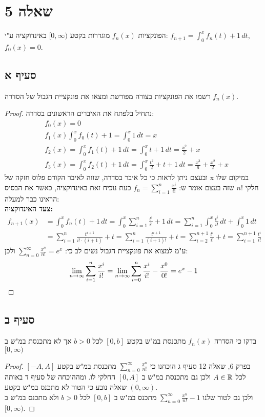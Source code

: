 \documentclass{article}
\begin{document}
	\pagebreak
	\section*{שאלה 5}
	הפונקציות $f_n(x)$ מוגדרות בקטע $[0, \infty)$ באינדוקציה ע"י:
	$f_{n+1} = \int_0^x f_n(t) + 1 \, dt$, $f_0(x) = 0$.
	\subsection*{סעיף א}
	רשמו את הפונקציות בצורה מפורשת ומצאו את פונקציית הגבול של הסדרה $f_n(x)$.
	\begin{proof}
		נתחיל בלפתח את האיברים הראשונים בסדרה:
		\begin{align*}
			&f_0(x) = 0 \\
			&f_1(x) \int_0^x f_0(t) + 1 = \int_0^x 1 \, dt = x \\
			&f_2(x) = \int_0^x f_1(t) + 1 \, dt = \int_0^x t + 1 \, dt = \frac{x^2}{2} + x \\
			&f_3(x) = \int_0^x f_2(t) + 1 \, dt = \int_0^x \frac{t^2}{2} + t + 1 \, dt = \frac{x^3}{6} + \frac{x^2}{2} + x
		\end{align*}
		ובעצם ניתן לראות כי כל איבר בסדרה, שווה לאיבר הקודם פלוס חזקה של x במיקום שלו חלקי $n!$
		שזה בעצם אומר ש: $f_n = \sum_{i=1}^n \frac{x^i}{i!}$
		כעת נוכיח זאת באינדוקציה, כאשר את הבסיס הראינו כבר למעלה: \\
		\textbf{צעד האינדוקציה:}
		\begin{align*}
			f_{n+1}(x)
			&= \int_0^x f_n(t) + 1 \, dt
			= \int_0^x \sum_{i=1}^n \frac{t^i}{i!} + 1 \, dt
			=  \sum_{i=1}^n \int_0^x \frac{t^i}{i!} \, dt + \int_0^x 1 \, dt \\
			&=  \sum_{i=1}^n \frac{t^{i + 1}}{i! \cdot (i+1)} + t
			=  \sum_{i=1}^n \frac{t^{i + 1}}{(i+1)!} + t
			=  \sum_{i=2}^{n + 1} \frac{t^i}{i!} + t
			=  \sum_{i=1}^{n + 1} \frac{t^i}{i!}
		\end{align*}
		ע"מ למצוא את פונקציית הגבול נשים לב כי: $\sum_{n=0}^\infty \frac{x^n}{n!} = e^x$
		ולכן:
		\begin{align*}
			\displaystyle{\lim_{n \to \infty}} \sum_{i=1}^n \frac{x^i}{i!}
			= \displaystyle{\lim_{n \to \infty}} \sum_{i=0}^n \frac{x^i}{i!} - \frac{x^0}{0!}
			= e^x - 1
		\end{align*}
	\end{proof}

	\subsection*{סעיף ב}
	בדקו כי הסדרה $f_n(x)$ מתכנסת במ"ש בקטע $[0, b]$ לכל $b > 0$ אך לא מתכנסת במ"ש ב $[0, \infty)$
	\begin{proof}
		בפרק 6, שאלה 12 סעיף ג הוכחנו כי $\sum_{n=0}^\infty \frac{x^n}{n!}$ מתכנסת במ"ש בקטע $[-A, A]$ לכל $A \in \mathbb{R}$ ולכן גם מתכנסת במ"ש ב $[0, A]$ החלקי לו.
		ומההוכחה של סעיף ד באותה שאלה נובע כי הטור לא מתכנס במ"ש בקטע $(0, \infty)$. \\
		ולכן גם לטור שלנו $\sum_{n=0}^\infty \frac{x^n}{n!} - 1$ מתכנס במ"ש ב $[0, b]$ לכל $b > 0$ ולא מתכנס במ"ש ב $[0, \infty)$.
	\end{proof}
\end{document}
